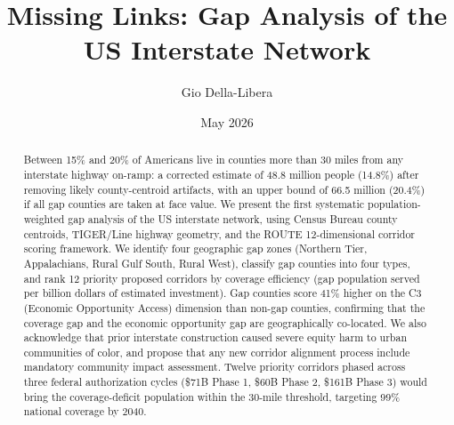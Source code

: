 \documentclass[12pt]{article}
\title{Missing Links: Gap Analysis of the US Interstate Network}
\author{Gio Della-Libera}
\date{May 2026}
\begin{document}
\maketitle

\begin{abstract}
Between 15\% and 20\% of Americans live in counties more than 30 miles from any interstate highway on-ramp: a corrected estimate of 48.8 million people (14.8\%) after removing likely county-centroid artifacts, with an upper bound of 66.5 million (20.4\%) if all gap counties are taken at face value. We present the first systematic population-weighted gap analysis of the US interstate network, using Census Bureau county centroids, TIGER/Line highway geometry, and the ROUTE 12-dimensional corridor scoring framework. We identify four geographic gap zones (Northern Tier, Appalachians, Rural Gulf South, Rural West), classify gap counties into four types, and rank 12 priority proposed corridors by coverage efficiency (gap population served per billion dollars of estimated investment). Gap counties score 41\% higher on the C3 (Economic Opportunity Access) dimension than non-gap counties, confirming that the coverage gap and the economic opportunity gap are geographically co-located. We also acknowledge that prior interstate construction caused severe equity harm to urban communities of color, and propose that any new corridor alignment process include mandatory community impact assessment. Twelve priority corridors phased across three federal authorization cycles (\$71B Phase 1, \$60B Phase 2, \$161B Phase 3) would bring the coverage-deficit population within the 30-mile threshold, targeting 99\% national coverage by 2040.
\end{abstract}












\end{document}
